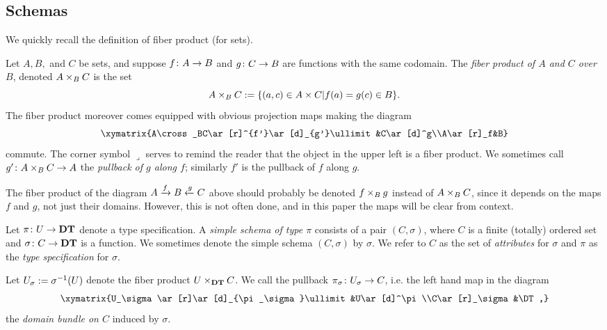 \documentclass{amsart}
\begin{document}
\subsection{Schemas}

We quickly recall the definition of fiber product (for sets).

\begin{definition}

Let $A, B,$ and $C$ be sets, and suppose $f\colon A\rightarrow B$ and $g\colon C\rightarrow B$ are functions with the same codomain.  The {\em fiber product of $A$ and $C$ over $B$}, denoted $A\times_BC$ is the set $$A\times_BC:=\{(a,c)\in A\times C | f(a)=g(c)\in B\}.$$  The fiber product moreover comes equipped with obvious projection maps making the diagram $$\xymatrix{A\cross_BC\ar[r]^{f'}\ar[d]_{g'}\ullimit&C\ar[d]^g\\A\ar[r]_f&B}$$ commute.  The corner symbol $\lrcorner$ serves to remind the reader that the object in the upper left is a fiber product.   We sometimes call $g'\colon A\times_BC\rightarrow A$ the {\em pullback of $g$ along $f$}; similarly $f'$ is the pullback of $f$ along $g$.

\end{definition}

\begin{remark}

The fiber product of the diagram $A\xrightarrow{f}B\xleftarrow{g}C$ above should probably be denoted $f\times_Bg$ instead of $A\times_BC$, since it depends on the maps $f$ and $g$, not just their domains.  However, this is not often done, and in this paper the maps will be clear from context.

\end{remark}

\begin{definition}\label{def:simple schema}

Let $\pi\colon U\rightarrow{\bf DT}$ denote a type specification.  A {\em simple schema of type $\pi$} consists of a pair $(C,\sigma)$, where $C$ is a finite (totally) ordered set and $\sigma\colon C\rightarrow{\bf DT}$ is a function.   We sometimes denote the simple schema $(C,\sigma)$ by $\sigma$.  We refer to $C$ as the set of {\em attributes} for $\sigma$ and $\pi$ as the {\em type specification} for $\sigma$.

Let $U_\sigma:=\sigma^\m1(U)$ denote the fiber product $U\times_{\bf DT} C$.  We call the pullback $\pi_\sigma\colon U_\sigma\rightarrow C$, i.e. the left hand map in the diagram $$\xymatrix{U_\sigma\ar[r]\ar[d]_{\pi_\sigma}\ullimit&U\ar[d]^\pi\\C\ar[r]_\sigma&\DT,}$$ the {\em domain bundle on $C$} induced by $\sigma$.

\end{definition}
\end{document}
